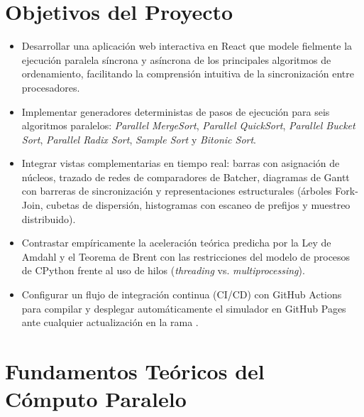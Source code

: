 \documentclass[11pt,letterpaper,oneside]{article}
\DeclareRobustCommand{\archivo}[1]{\texttt{\detokenize{#1}}}
\begin{document}
\tableofcontents
\medskip

\section{Objetivos del Proyecto}
\begin{itemize}
  \item Desarrollar una aplicación web interactiva en React que modele fielmente la ejecución paralela síncrona y asíncrona de los principales algoritmos de ordenamiento, facilitando la comprensión intuitiva de la sincronización entre procesadores.
  \item Implementar generadores deterministas de pasos de ejecución para seis algoritmos paralelos: \emph{Parallel MergeSort}, \emph{Parallel QuickSort}, \emph{Parallel Bucket Sort}, \emph{Parallel Radix Sort}, \emph{Sample Sort} y \emph{Bitonic Sort}.
  \item Integrar vistas complementarias en tiempo real: barras con asignación de núcleos, trazado de redes de comparadores de Batcher, diagramas de Gantt con barreras de sincronización y representaciones estructurales (árboles Fork-Join, cubetas de dispersión, histogramas con escaneo de prefijos y muestreo distribuido).
  \item Contrastar empíricamente la aceleración teórica predicha por la Ley de Amdahl y el Teorema de Brent con las restricciones del modelo de procesos de CPython frente al uso de hilos (\emph{threading} vs. \emph{multiprocessing}).
  \item Configurar un flujo de integración continua (CI/CD) con GitHub Actions para compilar y desplegar automáticamente el simulador en GitHub Pages ante cualquier actualización en la rama \archivo{simulacion}.
\end{itemize}

\section{Fundamentos Teóricos del Cómputo Paralelo}
\end{document}
